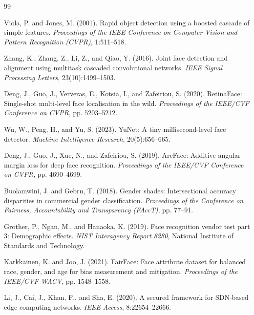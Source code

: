 \documentclass[12pt,a4paper]{report}
\begin{document}

\begin{thebibliography}{99}

Viola, P. and Jones, M. (2001).
\newblock Rapid object detection using a boosted cascade of simple features.
\newblock \textit{Proceedings of the IEEE Conference on Computer Vision and Pattern Recognition (CVPR)}, 1:511--518.

Zhang, K., Zhang, Z., Li, Z., and Qiao, Y. (2016).
\newblock Joint face detection and alignment using multitask cascaded convolutional networks.
\newblock \textit{IEEE Signal Processing Letters}, 23(10):1499--1503.

Deng, J., Guo, J., Ververas, E., Kotsia, I., and Zafeiriou, S. (2020).
\newblock RetinaFace: Single-shot multi-level face localisation in the wild.
\newblock \textit{Proceedings of the IEEE/CVF Conference on CVPR}, pp. 5203--5212.

Wu, W., Peng, H., and Yu, S. (2023).
\newblock YuNet: A tiny millisecond-level face detector.
\newblock \textit{Machine Intelligence Research}, 20(5):656--665.

Deng, J., Guo, J., Xue, N., and Zafeiriou, S. (2019).
\newblock ArcFace: Additive angular margin loss for deep face recognition.
\newblock \textit{Proceedings of the IEEE/CVF Conference on CVPR}, pp. 4690--4699.

Buolamwini, J. and Gebru, T. (2018).
\newblock Gender shades: Intersectional accuracy disparities in commercial gender classification.
\newblock \textit{Proceedings of the Conference on Fairness, Accountability and Transparency (FAccT)}, pp. 77--91.

Grother, P., Ngan, M., and Hanaoka, K. (2019).
\newblock Face recognition vendor test part 3: Demographic effects.
\newblock \textit{NIST Interagency Report 8280}, National Institute of Standards and Technology.

Karkkainen, K. and Joo, J. (2021).
\newblock FairFace: Face attribute dataset for balanced race, gender, and age for bias measurement and mitigation.
\newblock \textit{Proceedings of the IEEE/CVF WACV}, pp. 1548--1558.

Li, J., Cai, J., Khan, F., and Sha, E. (2020).
\newblock A secured framework for SDN-based edge computing networks.
\newblock \textit{IEEE Access}, 8:22654--22666.


\end{thebibliography}
\end{document}
